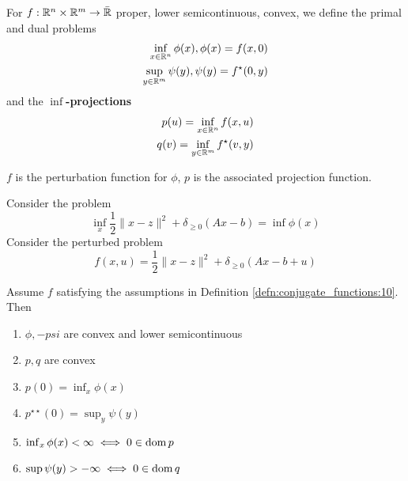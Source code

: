\begin{defn}
  \label{defn:conjugate_functions:10}
  For $f: \mathbb{R}^{n} \times \mathbb{R}^{m} \rightarrow \bar {\mathbb{R}}$ proper,
  lower semicontinuous, convex, we define the primal and dual problems
  \begin{align}
    \label{eq:68}
    \inf_{x \in \mathbb{R}^{n}} \phi(x), \phi(x) = f(x, 0) \\
    \sup_{y \in \mathbb{R}^{m}} \psi(y), \psi(y) = f^{\star}(0, y)
  \end{align}
  and the \textbf{$\inf$-projections}
  \begin{align}
    \label{eq:69}
    p(u) = \inf_{x \in \mathbb{R}^{n}} f(x, u) \\
    q(v) = \inf_{y \in \mathbb{R}^{m}} f^{\star}(v, y)
  \end{align}

  $f$ is the perturbation function for $\phi$, $p$ is the associated
  projection function.

  Consider the problem
  \begin{equation}
    \label{eq:70}
    \inf_{x} \frac{1}{2} \| x - z \|^{2} + \delta_{\geq 0} (Ax - b) =
    \inf \phi(x)
  \end{equation}
  Consider the perturbed problem
  \begin{equation}
    \label{eq:71}
    f(x, u) = \frac{1}{2} \| x - z \|^{2} + \delta_{\geq 0} (Ax - b + u)
  \end{equation}
\end{defn}

\begin{proposition}
  Assume $f$ satisfying the assumptions in Definition
  \ref{defn:conjugate_functions:10}.  Then
  \begin{enumerate}
  \item $\phi, -psi$ are convex and lower semicontinuous
  \item $p, q$ are convex
  \item $p(0) = \inf_{x} \phi(x)$
  \item $p^{\star \star}(0) = \sup_{y} \psi(y)$
  \item $\inf_{x} \phi(x) < \infty \iff 0 \in \operatorname*{dom} p$
  \item $\sup \psi(y) > -\infty \iff 0 \in \operatorname*{dom} q$
  \end{enumerate}
\end{proposition}

